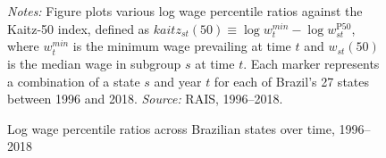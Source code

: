 \begin{figure}[!htb]
  \centering
  \caption{\label{fig:Lee_data}Log wage percentile ratios across Brazilian states over time, 1996--2018}
  \prefigvspace
  \hspace*{\fill}%
  \centerhfill[\qquad\qquad\qquad\qquad\qquad]
  \hspace*{\fill}
  \\
  \hspace*{\fill}%
  \centerhfill[\qquad\qquad\qquad\qquad\qquad]
  \hspace*{\fill}
  \\
  \postfigvspace
  \begin{minipage}[t]{1\columnwidth}%
    \begin{spacing}{0.75}
      \emph{\scriptsize{}Notes:}{\scriptsize{} Figure plots various log wage
      percentile ratios against the Kaitz-50 index, defined as $kaitz_{st}(50) \equiv \log w_{t}^{min} - \log w_{st}^{\text{P}50}$, where $w_{t}^{min}$ is the minimum wage prevailing at time $t$ and $w_{st}(50)$ is the median wage in subgroup $s$ at time $t$. Each marker represents a combination of a state $s$ and year $t$ for each
      of Brazil's 27 states between 1996 and 2018. %
      \emph{\scriptsize{}Source: } RAIS, 1996--2018.}
    \end{spacing}
  \end{minipage}
\end{figure}





